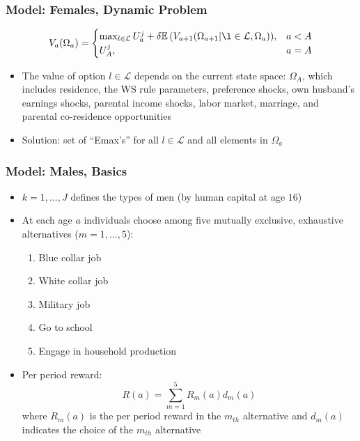 \begin{frame}
	\frametitle{Model: Females, Dynamic Problem}
	\begin{eqnarray}
		V_{a} (\Omega_{a}) = 
		\begin{cases}	
			\max_{l \in \mathcal{L}} {U_{a}^j + \delta \mathbb{E} \left(  V_{a+1}(\Omega_{a+1} | \l \in \mathcal{L}, \Omega_{a}) \right) }, & a < A \nonumber \\
			U_{A}^j, & a = A \nonumber
		\end{cases}  
	\end{eqnarray}
	\begin{itemize}
		\item The value of option $l \in \mathcal{L}$ depends on the current state space: $\Omega_{A}$, which includes residence, the WS rule parameters, preference shocks, own husband's earnings shocks, parental income shocks, labor market, marriage, and parental co-residence opportunities
		\item Solution: set of ``Emax's'' for all $l \in \mathcal{L}$ and all elements in $\Omega_{a}$ 
	\end{itemize}
\end{frame}

\begin{frame}
	\frametitle{Model: Males, Basics}
	\begin{itemize}
		\item $k = 1, \ldots, J$ defines the types of men (by human capital at age $16$)
		\item At each age $a$ individuals choose among five mutually exclusive, exhaustive alternatives ($m = 1, \ldots, 5$):
		\begin{enumerate}
			\item Blue collar job
			\item White collar job
			\item Military job
			\item Go to school
			\item Engage in household production
		\end{enumerate}
		\item Per period reward:
		\begin{equation}
			R(a) = \sum \limits _{m=1} ^ 5 R_{m}(a)d_{m}(a) \nonumber
		\end{equation}
		\noindent where $R_{m}(a)$ is the per period reward in the $m_{th}$ alternative and $d_{m}(a)$ indicates the choice of the $m_{th}$ alternative 
	\end{itemize}
\end{frame}

